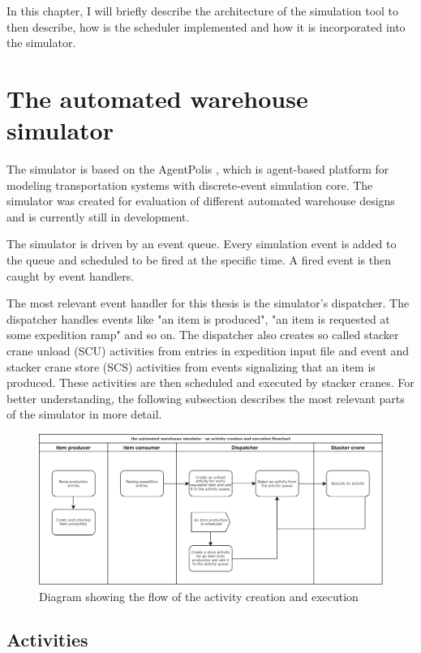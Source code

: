 \documentclass{ctuthesis}
\begin{document}
 In this chapter, I will briefly describe the architecture of the simulation tool to then describe, how is the scheduler implemented and how it is incorporated into the simulator.

\section{The automated warehouse simulator}

 The simulator is based on the AgentPolis \cite{agentpolis}, which is agent-based platform for modeling transportation systems with discrete-event simulation core. The simulator was created for evaluation of different automated warehouse designs and is currently still in development.
 
 The simulator is driven by an event queue. Every simulation event is added to the queue and scheduled to be fired at the specific time. A fired event is then caught by event handlers. 
 
 The most relevant event handler for this thesis is the simulator's dispatcher. The dispatcher handles events like "an item is produced", "an item is requested at some expedition ramp" and so on. The dispatcher also creates so called stacker crane unload (SCU) activities from entries in expedition input file and event and stacker crane store (SCS) activities from events signalizing that an item is produced. These activities are then scheduled and executed by stacker cranes. For better understanding, the following subsection describes the most relevant parts of the simulator in more detail.
 
\begin{figure}[H]
\includegraphics[width=1\linewidth]{flowchart2.png}
\caption{Diagram showing the flow of the activity creation and execution}
\label{flowchart1}
\end{figure}

\subsection{Activities}
\end{document}
